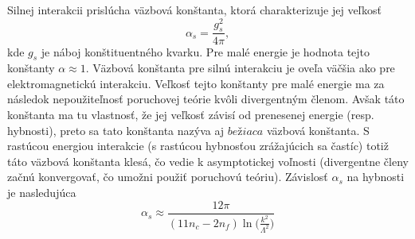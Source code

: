 \documentclass[../../main.tex]{subfiles}
\begin{document}
Silnej interakcii prislúcha väzbová konštanta, ktorá charakterizuje jej veľkosť
$$
\alpha_s= \frac{g_s^2}{4\pi},
$$
kde $g_s$ je náboj konštituentného kvarku. Pre malé energie je hodnota tejto konštanty $\alpha\approx 1$. Väzbová konštanta pre silnú interakciu je oveľa väčšia ako pre elektromagnetickú interakciu. Veľkosť tejto konštanty pre malé energie ma za následok nepoužiteľnosť poruchovej teórie kvôli divergentným členom. Avšak táto konštanta ma tu vlastnosť, že jej veľkosť závisí od prenesenej energie (resp. hybnosti), preto sa tato konštanta nazýva aj $bežiaca$ väzbová konštanta. S rastúcou energiou interakcie (s rastúcou hybnosťou zrážajúcich sa častíc) totiž táto väzbová konštanta klesá, čo vedie k asymptotickej voľnosti (divergentne členy začnú konvergovať, čo umožni použiť poruchovú teóriu). Závislosť $\alpha_s$ na hybnosti je nasledujúca
$$
\alpha_s\approx\frac{12\pi}{(11n_c-2n_f)\ln\big(\frac{k^2}{\Lambda^2}\big)}
$$ 
\end{document}
